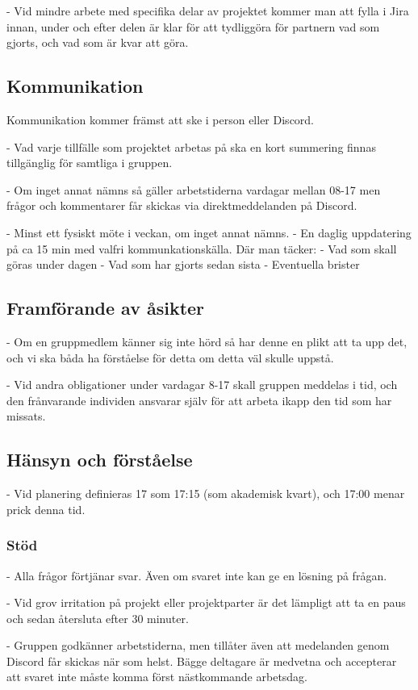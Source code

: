 \documentclass{mall}
\begin{document}
- Vid mindre arbete med specifika delar av projektet kommer man att fylla i Jira innan, under och efter delen är klar för att tydliggöra för partnern vad som gjorts, och vad som är kvar att göra.

\subsection{Kommunikation}
Kommunikation kommer främst att ske i person eller Discord.

- Vad varje tillfälle som projektet arbetas på ska en kort summering finnas tillgänglig för samtliga i gruppen.

- Om inget annat nämns så gäller arbetstiderna vardagar mellan 08-17 men frågor och kommentarer får skickas via direktmeddelanden på Discord.

- Minst ett fysiskt möte i veckan, om inget annat nämns.
- En daglig uppdatering på ca 15 min med valfri kommunkationskälla. Där man täcker:
      - Vad som skall göras under dagen
      - Vad som har gjorts sedan sista
      - Eventuella brister

\subsection{Framförande av åsikter}
- Om en gruppmedlem känner sig inte hörd så har denne en plikt att ta upp det, och vi ska båda ha förståelse för detta om detta väl skulle uppstå.

- Vid andra obligationer under vardagar 8-17 skall gruppen meddelas i tid, och den frånvarande individen ansvarar själv för att arbeta ikapp den tid som har missats.

\subsection{Hänsyn och förståelse}

- Vid planering definieras 17 som 17:15 (som akademisk kvart), och 17:00 menar prick denna tid.

\subsubsection{Stöd}

- Alla frågor förtjänar svar. Även om svaret inte kan ge en lösning på frågan.

- Vid grov irritation på projekt eller projektparter är det lämpligt att ta en paus och sedan återsluta efter 30 minuter.

- Gruppen godkänner arbetstiderna, men tillåter även att medelanden genom Discord får skickas när som helst. Bägge deltagare är medvetna och accepterar att svaret inte måste komma först nästkommande arbetsdag.
\end{document}
